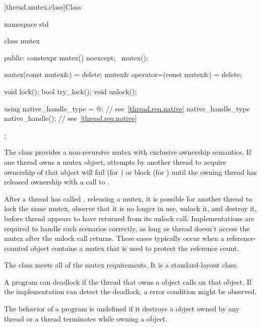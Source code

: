 [thread.mutex.class]{Class }

%
\begin{codeblock}
namespace std {
  class mutex {
  public:
    constexpr mutex() noexcept;
    ~mutex();

    mutex(const mutex&) = delete;
    mutex& operator=(const mutex&) = delete;

    void lock();
    bool try_lock();
    void unlock();

    using native_handle_type = @\impdefnc@;          // see~\ref{thread.req.native}
    native_handle_type native_handle();                         // see~\ref{thread.req.native}
  };
}
\end{codeblock}

\pnum
{}%
The class  provides a non-recursive mutex with exclusive ownership
semantics. If one thread owns a mutex object, attempts by another thread to acquire
ownership of that object will fail (for ) or block (for
) until the owning thread has released ownership with a call to
.

\pnum
\begin{note}
After a thread  has called , releasing a mutex, it is possible for another
thread  to lock the same mutex, observe that it is no longer in use, unlock it, and
destroy it, before thread  appears to have returned from its unlock call. Implementations
are required to handle such scenarios correctly, as long as thread  doesn't access the
mutex after the unlock call returns. These cases typically occur when a reference-counted object
contains a mutex that is used to protect the reference count.
\end{note}

\pnum
The class  meets
all of the mutex requirements.
It is a standard-layout class.

\pnum
\begin{note}
A program can deadlock if the thread that owns a  object calls
 on that object. If the implementation can detect the deadlock,
a  error condition might be observed.
\end{note}

\pnum
The behavior of a program is undefined if
it destroys a  object owned by any thread or
a thread terminates while owning a  object.

